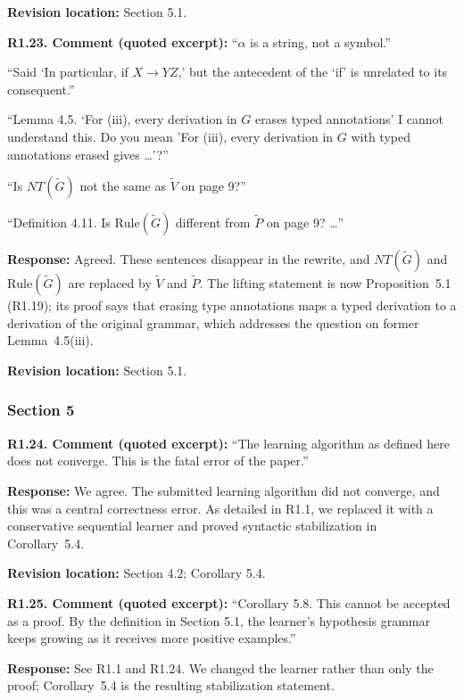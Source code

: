 \documentclass[
  10pt,
  a4paper,
]{article}
\begin{document}
\textbf{Revision location:} Section 5.1.


\textbf{R1.23. Comment (quoted excerpt):} ``\(\alpha\) is a string, not a
symbol.''

``Said `In particular, if \(X\to YZ\),' but the antecedent of the `if'
is unrelated to its consequent.''

``Lemma 4.5. `For (iii), every derivation in \(G\) erases typed
annotations' I cannot understand this. Do you mean 'For (iii), every
derivation
in \(G\) with typed annotations erased gives \ldots'?''

``Is \(NT(\widetilde G)\) not the same as \(\widetilde V\) on page 9?''

``Definition 4.11. Is \(\mathrm{Rule}(\widetilde G)\) different from
\(\widetilde P\) on page 9? \ldots{}''

\textbf{Response:} Agreed. These sentences disappear in the rewrite, and
$NT(\widetilde G)$ and $\mathrm{Rule}(\widetilde G)$ are replaced by
$\widetilde V$ and $\widetilde P$. The lifting statement is now
Proposition~5.1 (R1.19); its proof says that erasing type annotations maps
a typed derivation to a derivation of the original grammar, which
addresses the question on former Lemma~4.5(iii).

\textbf{Revision location:} Section 5.1.


\subsubsection{Section 5}\label{section-5}

\textbf{R1.24. Comment (quoted excerpt):} ``The learning algorithm as defined
here does not converge. This is the fatal error of the paper.''

\textbf{Response:} We agree. The submitted learning algorithm did not
converge, and this was a central correctness error. As detailed in R1.1,
we replaced it with a conservative sequential learner and proved syntactic
stabilization in Corollary~5.4.

\textbf{Revision location:} Section 4.2; Corollary 5.4.


\textbf{R1.25. Comment (quoted excerpt):} ``Corollary 5.8. This cannot be
accepted as a proof. By the definition in Section 5.1, the learner's
hypothesis grammar keeps growing as it receives more positive
examples.''

\textbf{Response:} See R1.1 and R1.24.  We changed the learner rather than
only the proof; Corollary~5.4 is the resulting stabilization statement.
\end{document}
